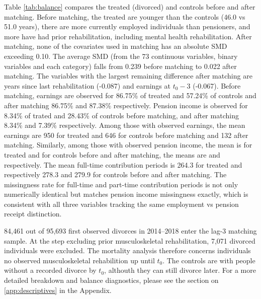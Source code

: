 \documentclass[a4paper,12pt]{article}
\theoremstyle{plain}
\theoremstyle{definition}
\theoremstyle{TheoremNum}
\theoremstyle{CorollaryNum}
\theoremstyle{PropositionNum}
\theoremstyle{TheoremNum}
\begin{document}
Table \ref{tab:balance} compares the treated (divorced) and controls before and after matching. Before matching, the treated are younger than the controls (46.0 vs 51.0 years), there are more currently employed individuals than pensioners, and more have had prior rehabilitation, including mental health rehabilitation. After matching, none of the covariates used in matching has an absolute SMD exceeding 0.10. The average SMD (from the 73 continuous variables, binary variables and each category) falls from 0.239 before matching to 0.022 after matching. The variables with the largest remaining difference after matching are years since last rehabilitation (-0.087) and earnings at $t_0 -3$ (-0.067). Before matching, earnings are observed for 86.75\% of treated and 57.24\% of controls and after matching 86.75\% and 87.38\% respectively. Pension income is observed for 8.34\% of trated and 28.43\% of controls before matching, and after matching 8.34\% and 7.39\% respectively. Among those with observed earnings, the mean earnings are 950 for treated and 646 for controls before matching and 132 after matching. Similarly, among those with observed pension income, the mean is  for treated and for controls before and after matching, the means are  and  respectively. The mean full-time contribution periods is 264.3 for treated and respectively 278.3 and 279.9 for controls before and after matching. The missingness rate for full-time and part-time contribution periods is not only numerically identical but matches pension income missingness exactly, which is consistent with all three variables tracking the same employment vs pension receipt distinction.

84,461 out of 95,693 first observed divorces in 2014--2018 enter the lag-3 matching sample. At the step excluding prior musculoskeletal rehabilitation, 7,071 divorced individuals were excluded. The mortality analysis therefore concerns individuals no observed musculoskeletal rehabilition up until $t_0$. The controls are with people without a recorded divorce by $t_0$, althouth they can still divorce later. For a more detailed breakdown and balance diagnostics, please see the section on \ref{app:descriptives} in the Appendix.
\end{document}
